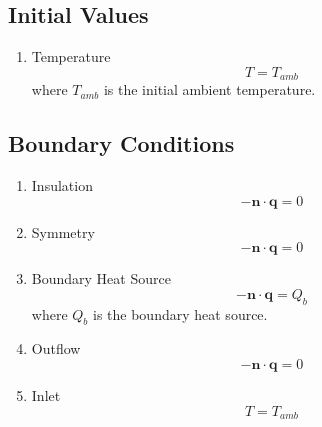     \subsection{Initial Values}
        \begin{enumerate}
            \item Temperature
                \begin{equation}
                    T = T_{amb}
                \end{equation}
                where \(T_{amb}\) is the initial ambient temperature.
        \end{enumerate}

    \subsection{Boundary Conditions}
        \begin{enumerate}
            \item Insulation
                \begin{equation}
                    -\mathbf{n} \cdot \mathbf{q} = 0
                \end{equation}
        
            \item Symmetry
                \begin{equation}
                    -\mathbf{n} \cdot \mathbf{q} = 0
                \end{equation}
        
            \item Boundary Heat Source
                \begin{equation}
                    -\mathbf{n} \cdot \mathbf{q} = Q_b
                \end{equation}
                where \(Q_b\) is the boundary heat source.
            
            \item Outflow
                \begin{equation}
                    -\mathbf{n} \cdot \mathbf{q} = 0
                \end{equation}
        
            \item Inlet
                \begin{equation}
                    T = T_{amb}
                \end{equation}
        \end{enumerate}

